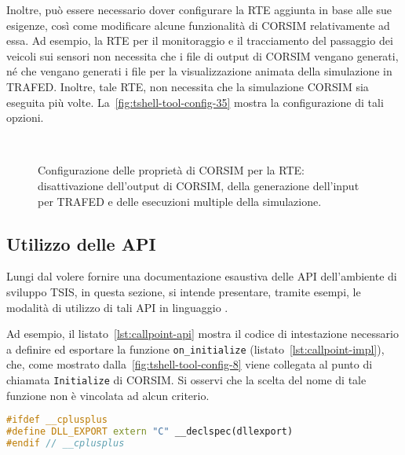 Inoltre, può essere necessario dover configurare la \acs{RTE} aggiunta in base alle sue esigenze, così come modificare alcune funzionalità di \acs{CORSIM} relativamente ad essa. Ad esempio, la \acs{RTE} per il monitoraggio e il tracciamento del passaggio dei veicoli sui sensori non necessita che i file di output di \acs{CORSIM} vengano generati, né che vengano generati i file per la visualizzazione animata della simulazione in \acs{TRAFED}. Inoltre, tale \acs{RTE}, non necessita che la simulazione \acs{CORSIM} sia eseguita più volte. La~\vref{fig:tshell-tool-config-35} mostra la configurazione di tali opzioni.
\begin{figure}[H]
\centering
{} \\
\caption[Configurazione delle proprietà di \acs{CORSIM}]{Configurazione delle proprietà di \acs{CORSIM} per la \acs{RTE}: disattivazione dell'output di \acs{CORSIM}, della generazione dell'input per \acs{TRAFED} e delle esecuzioni multiple della simulazione.}
\label{fig:tshell-tool-config-35}
\end{figure}

\cleardoublepage
\subsection{Utilizzo delle API}\label{subsec:tsis-api-examples}
Lungi dal volere fornire una documentazione esaustiva delle \acs{API} dell'ambiente di sviluppo \acs{TSIS}, in questa sezione, si intende presentare, tramite esempi, le modalità di utilizzo di tali \acs{API} in linguaggio \CC{}.

Ad esempio, il listato~\ref{lst:callpoint-api} mostra il codice di intestazione necessario a definire ed esportare la funzione \lstinline[]|on_initialize| (listato~\ref{lst:callpoint-impl}), che, come mostrato dalla~\vref{fig:tshell-tool-config-8} viene collegata al punto di chiamata \lstinline[]|Initialize| di \acs{CORSIM}. Si osservi che la scelta del nome di tale funzione non è vincolata ad alcun criterio.

\vspace*{8pt}\begin{lstlisting}[language=cpp, caption=Costrutto per l'esportazione delle funzioni \acs{RTE}, label=lst:callpoint-api]
#ifdef __cplusplus
#define DLL_EXPORT extern "C" __declspec(dllexport)
#endif // __cplusplus
\end{lstlisting}

